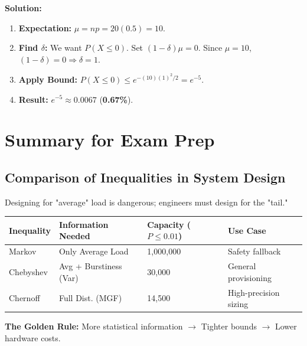 \documentclass[11pt]{article}
\begin{document}
\textbf{Solution:}
\begin{enumerate}
    \item \textbf{Expectation:} $\mu = np = 20(0.5) = 10$.
    \item \textbf{Find $\delta$:} We want $P(X \le 0)$. Set $(1 - \delta)\mu = 0$. Since $\mu = 10$, $(1 - \delta) = 0 \Rightarrow \delta = 1$.
    \item \textbf{Apply Bound:} $P(X \le 0) \le e^{-(10)(1)^{2}/2} = e^{-5}$.
    \item \textbf{Result:} $e^{-5} \approx 0.0067$ (\textbf{0.67\%}).
\end{enumerate}

\section{Summary for Exam Prep}

\subsection{Comparison of Inequalities in System Design}
Designing for "average" load is dangerous; engineers must design for the "tail."

\begin{table}[h]
\centering
\begin{tabular}{@{}llll@{}}
\toprule
\textbf{Inequality} & \textbf{Information Needed} & \textbf{Capacity ($P \le 0.01$)} & \textbf{Use Case} \\ \midrule
Markov & Only Average Load & 1,000,000 & Safety fallback \\
Chebyshev & Avg + Burstiness (Var) & 30,000 & General provisioning \\
Chernoff & Full Dist. (MGF) & 14,500 & High-precision sizing \\ \bottomrule
\end{tabular}
\end{table}

\textbf{The Golden Rule:} More statistical information $\rightarrow$ Tighter bounds $\rightarrow$ Lower hardware costs.
\end{document}
